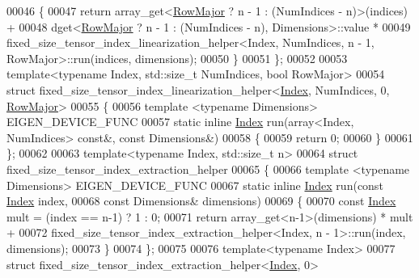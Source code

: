\begin{DoxyCode}
00046   \{
00047     \textcolor{keywordflow}{return} array\_get<\hyperlink{group__enums_ggaacded1a18ae58b0f554751f6cdf9eb13acfcde9cd8677c5f7caf6bd603666aae3}{RowMajor} ? n - 1 : (NumIndices - n)>(indices) +
00048         dget<\hyperlink{group__enums_ggaacded1a18ae58b0f554751f6cdf9eb13acfcde9cd8677c5f7caf6bd603666aae3}{RowMajor} ? n - 1 : (NumIndices - n), Dimensions>::value *
00049         fixed\_size\_tensor\_index\_linearization\_helper<Index, NumIndices, n - 1, RowMajor>::run(indices, 
      dimensions);
00050   \}
00051 \};
00052 
00053 \textcolor{keyword}{template}<\textcolor{keyword}{typename} Index, std::\textcolor{keywordtype}{size\_t} NumIndices, \textcolor{keywordtype}{bool} RowMajor>
00054 \textcolor{keyword}{struct }fixed\_size\_tensor\_index\_linearization\_helper<\hyperlink{namespace_eigen_a62e77e0933482dafde8fe197d9a2cfde}{Index}, NumIndices, 0, 
      \hyperlink{group__enums_ggaacded1a18ae58b0f554751f6cdf9eb13acfcde9cd8677c5f7caf6bd603666aae3}{RowMajor}>
00055 \{
00056   \textcolor{keyword}{template} <\textcolor{keyword}{typename} Dimensions> EIGEN\_DEVICE\_FUNC
00057   \textcolor{keyword}{static} \textcolor{keyword}{inline} \hyperlink{namespace_eigen_a62e77e0933482dafde8fe197d9a2cfde}{Index} run(array<Index, NumIndices> \textcolor{keyword}{const}&, \textcolor{keyword}{const} Dimensions&)
00058   \{
00059     \textcolor{keywordflow}{return} 0;
00060   \}
00061 \};
00062 
00063 \textcolor{keyword}{template}<\textcolor{keyword}{typename} Index, std::\textcolor{keywordtype}{size\_t} n>
00064 \textcolor{keyword}{struct }fixed\_size\_tensor\_index\_extraction\_helper
00065 \{
00066   \textcolor{keyword}{template} <\textcolor{keyword}{typename} Dimensions> EIGEN\_DEVICE\_FUNC
00067   \textcolor{keyword}{static} \textcolor{keyword}{inline} \hyperlink{namespace_eigen_a62e77e0933482dafde8fe197d9a2cfde}{Index} run(\textcolor{keyword}{const} \hyperlink{namespace_eigen_a62e77e0933482dafde8fe197d9a2cfde}{Index} index,
00068                           \textcolor{keyword}{const} Dimensions& dimensions)
00069   \{
00070     \textcolor{keyword}{const} \hyperlink{namespace_eigen_a62e77e0933482dafde8fe197d9a2cfde}{Index} mult = (index == n-1) ? 1 : 0;
00071     \textcolor{keywordflow}{return} array\_get<n-1>(dimensions) * mult +
00072         fixed\_size\_tensor\_index\_extraction\_helper<Index, n - 1>::run(index, dimensions);
00073   \}
00074 \};
00075 
00076 \textcolor{keyword}{template}<\textcolor{keyword}{typename} Index>
00077 \textcolor{keyword}{struct }fixed\_size\_tensor\_index\_extraction\_helper<\hyperlink{namespace_eigen_a62e77e0933482dafde8fe197d9a2cfde}{Index}, 0>

\end{DoxyCode}
